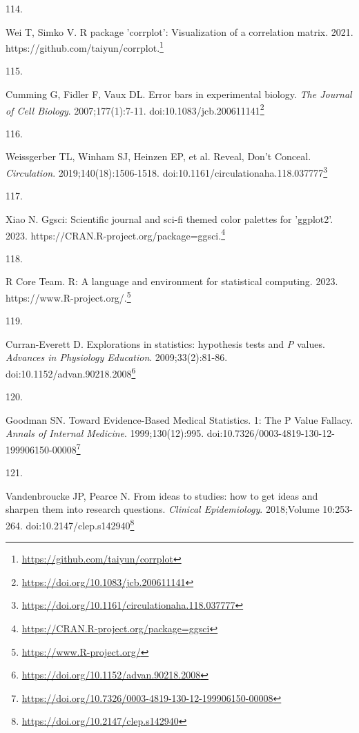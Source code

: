 \documentclass[
  a4paper,
]{book}
\newlength{\cslhangindent}
\newlength{\csllabelwidth}
\newlength{\cslentryspacingunit} %
\newenvironment{CSLReferences}[2] %
 {%
  \setlength{\parindent}{0pt}
  \ifodd #1
  \let\oldpar\par
  \def\par{\hangindent=\cslhangindent\oldpar}
  \fi
  \setlength{\parskip}{#2\cslentryspacingunit}
 }%
 {}
\newcommand{\CSLLeftMargin}[1]{\parbox[t]{\csllabelwidth}{#1}}
\newcommand{\CSLRightInline}[1]{\parbox[t]{\linewidth - \csllabelwidth}{#1}\break}
\renewcommand{\href}[2]{#2\footnote{\url{#1}}}
\begin{document}
\begin{CSLReferences}{0}{0}
\leavevmode{}%
\CSLLeftMargin{114. }%
\CSLRightInline{Wei T, Simko V. R package 'corrplot': Visualization of a correlation matrix. 2021. \href{https://github.com/taiyun/corrplot}{https://github.com/taiyun/corrplot.}}

\leavevmode{}%
\CSLLeftMargin{115. }%
\CSLRightInline{Cumming G, Fidler F, Vaux DL. Error bars in experimental biology. \emph{The Journal of Cell Biology}. 2007;177(1):7-11. doi:\href{https://doi.org/10.1083/jcb.200611141}{10.1083/jcb.200611141}}

\leavevmode{}%
\CSLLeftMargin{116. }%
\CSLRightInline{Weissgerber TL, Winham SJ, Heinzen EP, et al. Reveal, Don{'}t Conceal. \emph{Circulation}. 2019;140(18):1506-1518. doi:\href{https://doi.org/10.1161/circulationaha.118.037777}{10.1161/circulationaha.118.037777}}

\leavevmode{}%
\CSLLeftMargin{117. }%
\CSLRightInline{Xiao N. Ggsci: Scientific journal and sci-fi themed color palettes for 'ggplot2'. 2023. \href{https://CRAN.R-project.org/package=ggsci}{https://CRAN.R-project.org/package=ggsci.}}

\leavevmode{}%
\CSLLeftMargin{118. }%
\CSLRightInline{R Core Team. R: A language and environment for statistical computing. 2023. \href{https://www.R-project.org/}{https://www.R-project.org/.}}

\leavevmode{}%
\CSLLeftMargin{119. }%
\CSLRightInline{Curran-Everett D. Explorations in statistics: hypothesis tests and {\emph{P}} values. \emph{Advances in Physiology Education}. 2009;33(2):81-86. doi:\href{https://doi.org/10.1152/advan.90218.2008}{10.1152/advan.90218.2008}}

\leavevmode{}%
\CSLLeftMargin{120. }%
\CSLRightInline{Goodman SN. Toward Evidence-Based Medical Statistics. 1: The P Value Fallacy. \emph{Annals of Internal Medicine}. 1999;130(12):995. doi:\href{https://doi.org/10.7326/0003-4819-130-12-199906150-00008}{10.7326/0003-4819-130-12-199906150-00008}}

\leavevmode{}%
\CSLLeftMargin{121. }%
\CSLRightInline{Vandenbroucke JP, Pearce N. From ideas to studies: how to get ideas and sharpen them into research questions. \emph{Clinical Epidemiology}. 2018;Volume 10:253-264. doi:\href{https://doi.org/10.2147/clep.s142940}{10.2147/clep.s142940}}


\end{CSLReferences}
\end{document}
